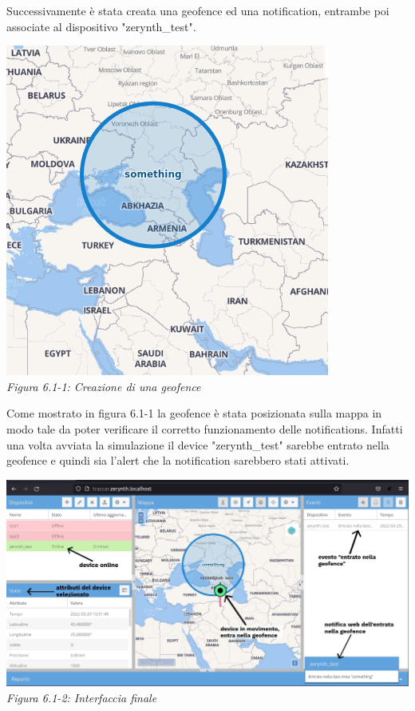\documentclass[a4paper,titlepage,12pt]{book}
\begin{document}
{Successivamente è stata creata una geofence ed una notification, entrambe poi associate al dispositivo "zerynth\_test". 

\begin{center}
\includegraphics[scale=0.6]{images/geofence.png}\\ 
\textit{Figura 6.1-1: Creazione di una geofence}
\end{center}


Come mostrato in figura 6.1-1 la geofence è stata posizionata sulla mappa in modo tale da poter verificare il corretto funzionamento delle notifications. Infatti una volta avviata la simulazione il device "zerynth\_test" sarebbe entrato nella geofence e quindi sia l'alert che la notification sarebbero stati attivati.
\\
\begin{center}
\includegraphics[scale=1.5]{images/interfaccia_completa.jpg}\\ 
\textit{Figura 6.1-2: Interfaccia finale}
\end{center}

}
\end{document}
